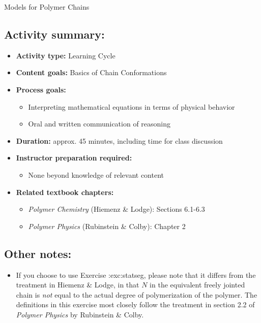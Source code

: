 \begin{activity}{Models for Polymer Chains}
\begin{instructornotes}
	\subsection*{Activity summary:}
	\begin{itemize}
		\item \textbf{Activity type:} Learning Cycle
		\item \textbf{Content goals:} Basics of Chain Conformations
		\item \textbf{Process goals:} %
			\begin{itemize}
				\item Interpreting mathematical equations in terms of physical behavior
				\item Oral and written communication of reasoning
			\end{itemize}
		\item \textbf{Duration:} approx. 45 minutes, including time for class discussion
		\item \textbf{Instructor preparation required:} 
			\begin{itemize}
				\item None beyond knowledge of relevant content
			\end{itemize}
		\item \textbf{Related textbook chapters:}
			\begin{itemize}
				\item \emph{Polymer Chemistry} (Hiemenz \& Lodge): Sections 6.1-6.3
				\item \emph{Polymer Physics} (Rubinstein \& Colby): Chapter 2
			\end{itemize}
	\end{itemize}
	
	\subsection*{Other notes:}
	
		\begin{itemize}
		\item If you choose to use Exercise {:exc:statseg}, please note that it differs from the treatment in Hiemenz \& Lodge, in that $N$ in the equivalent freely jointed chain is \emph{not} equal to the actual degree of polymerization of the polymer.  The definitions in this exercise most closely follow the treatment in section 2.2 of \emph{Polymer Physics} by Rubinstein \& Colby.
		\end{itemize}


\end{instructornotes}
\end{activity}
